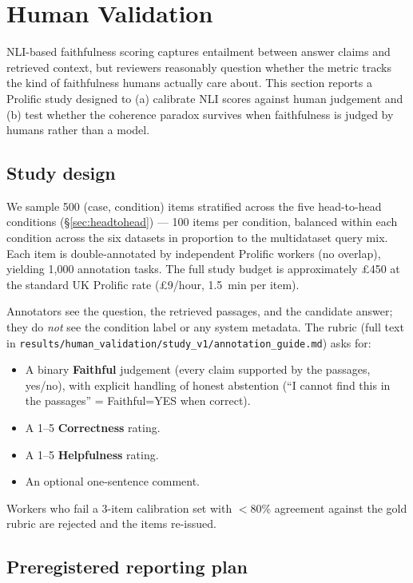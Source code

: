 \section{Human Validation}
\label{sec:human}

NLI-based faithfulness scoring captures entailment between answer claims
and retrieved context, but reviewers reasonably question whether the
metric tracks the kind of faithfulness humans actually care about. This
section reports a Prolific study designed to (a) calibrate NLI scores
against human judgement and (b) test whether the coherence paradox
survives when faithfulness is judged by humans rather than a model.

\subsection{Study design}

We sample 500 (case, condition) items stratified across the five
head-to-head conditions (§\ref{sec:headtohead}) — 100 items per
condition, balanced within each condition across the six datasets in
proportion to the multidataset query mix. Each item is double-annotated
by independent Prolific workers (no overlap), yielding 1{,}000 annotation
tasks. The full study budget is approximately £450 at the standard UK
Prolific rate (£9/hour, 1.5~min per item).

Annotators see the question, the retrieved passages, and the candidate
answer; they do \emph{not} see the condition label or any system
metadata. The rubric (full text in
\texttt{results/human\_validation/study\_v1/annotation\_guide.md}) asks
for:

\begin{itemize}
  \item A binary \textbf{Faithful} judgement (every claim supported by
        the passages, yes/no), with explicit handling of honest
        abstention (``I cannot find this in the passages'' = Faithful=YES
        when correct).
  \item A 1--5 \textbf{Correctness} rating.
  \item A 1--5 \textbf{Helpfulness} rating.
  \item An optional one-sentence comment.
\end{itemize}

Workers who fail a 3-item calibration set with $<$80\% agreement against
the gold rubric are rejected and the items re-issued.

\subsection{Preregistered reporting plan}
\label{sec:human_plan}

